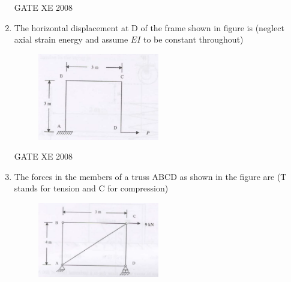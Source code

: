 \documentclass[12pt]{article}
\begin{document}
\begin{enumerate}
\begin{enumerate}
\end{enumerate}
    
    GATE XE 2008  


    \item The horizontal displacement at D of the frame shown in figure is (neglect axial strain energy and assume $EI$ to be constant throughout) 

    \begin{figure}[H]
    \centering
    \includegraphics[width=0.5\textwidth]{figs/ass1_f_q23.png}
    \caption{}
    \end{figure}

\begin{enumerate}
\end{enumerate}
    
    GATE XE 2008  

    \item The forces in the members of a truss ABCD as shown in the figure are (T stands for tension and C for compression)  

    \begin{figure}[H]
    \centering
    \includegraphics[width=0.5\textwidth]{figs/ass1_f_q24.png}
    \caption{}
    \end{figure}


\end{enumerate}
\end{document}
